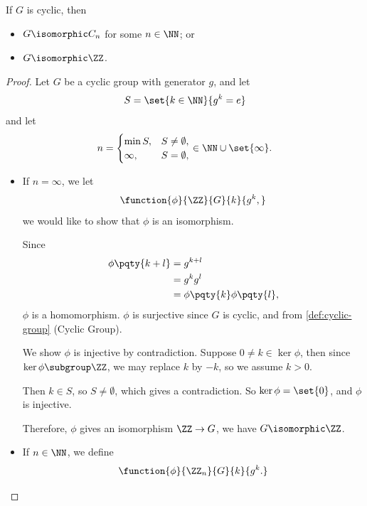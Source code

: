 \begin{theorem}
    \label{thm:classification-cyclic-groups}%
    If \(G\) is cyclic, then
    \begin{itemize}
        \item \(G \isomorphic C_n\) for some \(n \in \NN\); or
        \item \(G \isomorphic \ZZ\).
    \end{itemize}
\end{theorem}

\begin{proof}
    Let \(G\) be a cyclic group with generator \(g\), and let
    \[
        S = \set{k \in \NN}{g^k = e}
    \]
    and let
    \[
        n = \begin{cases}
            \min S, & S \neq \emptyset, \\
            \infty, & S = \emptyset,
        \end{cases}
        \in \NN \cup \set{\infty}.
    \]

    \begin{itemize}
        \item If \(n = \infty\), we let
        \[
            \function{\phi}{\ZZ}{G}{k}{g^k,}
        \]
        we would like to show that \(\phi\) is an isomorphism.

        Since
        \begin{align*}
            \phi \pqty{k + l} &= g^{k + l} \\
            &= g^k g^l \\
            &= \phi \pqty{k} \phi \pqty{l},
        \end{align*}
        \(\phi\) is a homomorphism. \(\phi\) is surjective since \(G\) is cyclic, and from \autoref{def:cyclic-group} (Cyclic Group).

        We show \(\phi\) is injective by contradiction. Suppose \(0 \neq k \in \ker \phi\), then since \(\ker \phi \subgroup \ZZ\), we may replace \(k\) by \(-k\), so we assume \(k > 0\).

        Then \(k \in S\), so \(S \neq \emptyset\), which gives a contradiction. So \(\ker \phi = \set{0}\), and \(\phi\) is injective.

        Therefore, \(\phi\) gives an isomorphism \(\ZZ \to G\), we have \(G \isomorphic \ZZ\).

        \item If \(n \in \NN\), we define
        \[
            \function{\phi}{\ZZ_n}{G}{k}{g^k.}
        \]


\end{itemize}
\end{proof}
